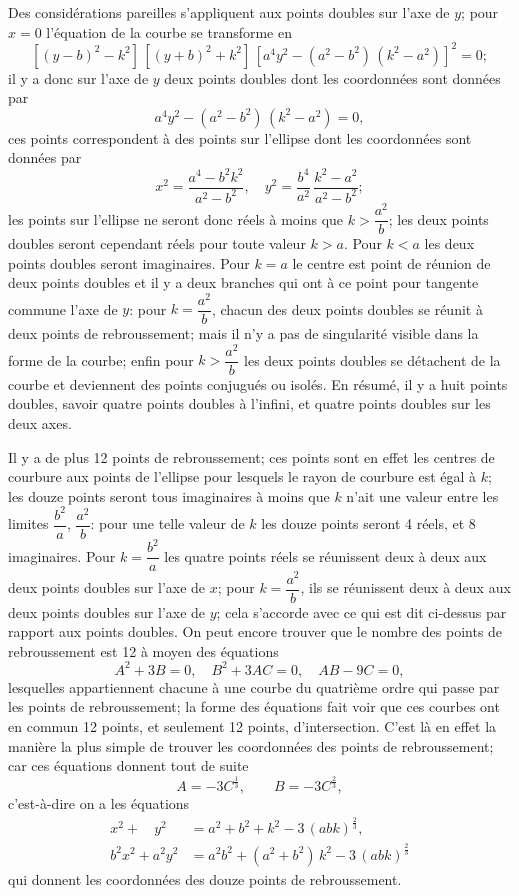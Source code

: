 \documentclass[11pt,a4paper]{article}
\theoremstyle{plain}
\theoremstyle{definition}
\begin{document}
\newpage
Des consid\'{e}rations pareilles s'appliquent aux points doubles sur l'axe de $y$; pour $x=0$ l'\'{e}quation de la courbe se transforme en
\[
[(y-b)^2-k^2]\,[(y+b)^2+k^2]\,[a^4y^2-(a^2-b^2)\,(k^2-a^2)]^2 = 0;
\]
il y a donc sur l'axe de $y$ deux points doubles dont les coordonn\'{e}es sont donn\'{e}es par
\[
a^4y^2 - (a^2-b^2)\,(k^2-a^2) = 0,
\]
ces points correspondent \`{a} des points sur l'ellipse dont les coordonn\'{e}es sont donn\'{e}es par
\[
x^2 = \frac{a^4-b^2k^2}{a^2-b^2}, \quad y^2 = \frac{b^4}{a^2}\,\frac{k^2-a^2}{a^2-b^2};
\]
les points sur l'ellipse ne seront donc r\'{e}els \`{a} moins que $k > \dfrac{a^2}{b}$; les deux points doubles seront cependant r\'{e}els pour toute valeur $k > a$. Pour $k < a$ les deux points doubles seront imaginaires. Pour $k=a$ le centre est point de r\'{e}union de deux points doubles et il y a deux branches qui ont \`{a} ce point pour tangente commune l'axe de $y$: pour $k = \dfrac{a^2}{b}$, chacun des deux points doubles se r\'{e}unit \`{a} deux points de rebroussement; mais il n'y a pas de singularit\'{e} visible dans la forme de la courbe; enfin pour $k > \dfrac{a^2}{b}$ les deux points doubles se d\'{e}tachent de la courbe et deviennent des points conjugu\'{e}s ou isol\'{e}s. En r\'{e}sum\'{e}, il y a huit points doubles, savoir quatre points doubles \`{a} l'infini, et quatre points doubles sur les deux axes.

Il y a de plus 12 points de rebroussement; ces points sont en effet les centres de courbure aux points de l'ellipse pour lesquels le rayon de courbure est \'{e}gal \`{a} $k$; les douze points seront tous imaginaires \`{a} moins que $k$ n'ait une valeur entre les limites $\dfrac{b^2}{a}$, $\dfrac{a^2}{b}$: pour une telle valeur de $k$ les douze points seront 4 r\'{e}els, et 8 imaginaires. Pour $k = \dfrac{b^2}{a}$ les quatre points r\'{e}els se r\'{e}unissent deux \`{a} deux aux deux points doubles sur l'axe de $x$; pour $k = \dfrac{a^2}{b}$, ils se r\'{e}unissent deux \`{a} deux aux deux points doubles sur l'axe de $y$; cela s'accorde avec ce qui est dit ci-dessus par rapport aux points doubles. On peut encore trouver que le nombre des points de rebroussement est 12 \`{a} moyen des \'{e}quations
\[
A^2 + 3B = 0, \quad B^2 + 3AC = 0, \quad AB - 9C = 0,
\]
lesquelles appartiennent chacune \`{a} une courbe du quatri\`{e}me ordre qui passe par les points de rebroussement; la forme des \'{e}quations fait voir que ces courbes ont en commun 12 points, et seulement 12 points, d'intersection. C'est l\`{a} en effet la mani\`{e}re la plus simple de trouver les coordonn\'{e}es des points de rebroussement; car ces \'{e}quations donnent tout de suite
\[
A = -3C^{\frac{1}{3}}, \qquad B = -3C^{\frac{2}{3}},
\]
c'est-\`{a}-dire on a les \'{e}quations
\begin{align*}
x^2 + \phantom{a^2}y^2 &= a^2 + b^2 + k^2 - 3\,(abk)^{\frac{2}{3}}, \\
b^2x^2 + a^2y^2 &= a^2b^2 + (a^2+b^2)\,k^2 - 3\,(abk)^{\frac{2}{3}}
\end{align*}
qui donnent les coordonn\'{e}es des douze points de rebroussement.
\end{document}
